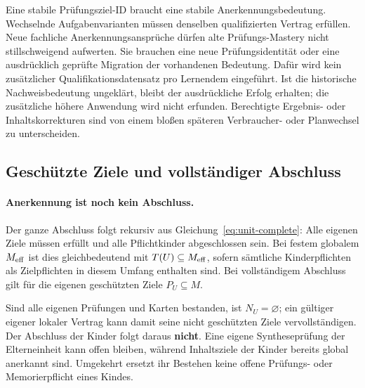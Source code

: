 Eine stabile Prüfungsziel-ID braucht eine stabile Anerkennungsbedeutung.
Wechselnde Aufgabenvarianten müssen denselben qualifizierten Vertrag erfüllen.
Neue fachliche Anerkennungsansprüche dürfen alte Prüfungs-Mastery nicht
stillschweigend aufwerten. Sie brauchen eine neue Prüfungsidentität oder
eine ausdrücklich geprüfte Migration der vorhandenen Bedeutung. Dafür wird
kein zusätzlicher Qualifikationsdatensatz pro Lernendem eingeführt.
Ist die historische Nachweisbedeutung ungeklärt, bleibt der ausdrückliche
Erfolg erhalten; die zusätzliche höhere Anwendung wird nicht erfunden.
Berechtigte Ergebnis- oder Inhaltskorrekturen sind von einem bloßen späteren
Verbraucher- oder Planwechsel zu unterscheiden.

\subsection{Geschützte Ziele und vollständiger Abschluss}
\paragraph{Anerkennung ist noch kein Abschluss.}
Der ganze Abschluss folgt rekursiv aus Gleichung~\eqref{eq:unit-complete}:
Alle eigenen Ziele müssen erfüllt und alle Pflichtkinder abgeschlossen sein.
Bei festem globalem $M_{\mathrm{eff}}$ ist dies gleichbedeutend mit
$T(U)\subseteq M_{\mathrm{eff}}$, sofern sämtliche Kinderpflichten als
Zielpflichten in diesem Umfang enthalten sind. Bei vollständigem Abschluss
gilt für die eigenen geschützten Ziele $P_U\subseteq M$.

Sind alle eigenen Prüfungen und Karten bestanden, ist $N_U=\varnothing$;
ein gültiger eigener lokaler Vertrag kann damit seine nicht geschützten
Ziele vervollständigen. Der Abschluss der Kinder folgt daraus
\textbf{nicht}. Eine eigene Syntheseprüfung der Elterneinheit kann offen
bleiben, während Inhaltsziele der Kinder bereits global anerkannt sind.
Umgekehrt ersetzt ihr Bestehen keine offene Prüfungs- oder Memorierpflicht
eines Kindes.

